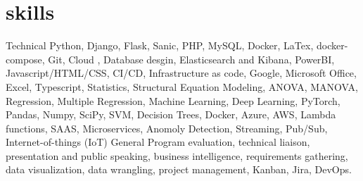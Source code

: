\documentclass[]{twentysecondcv}
\begin{document}
\section{skills}
	\begin{twentyshort}
	\twentyitemshort
	{Technical}
	{Python, Django, Flask, Sanic, PHP, MySQL, Docker, LaTex, docker-compose, Git, Cloud , Database desgin, Elasticsearch and Kibana, PowerBI, Javascript/HTML/CSS, CI/CD, Infrastructure as code, Google, Microsoft Office, Excel, Typescript, Statistics, Structural Equation Modeling, ANOVA, MANOVA, Regression, Multiple Regression, Machine Learning, Deep Learning, PyTorch, Pandas, Numpy, SciPy, SVM, Decision Trees, Docker, Azure, AWS, Lambda functions, SAAS, Microservices, Anomoly Detection, Streaming, Pub/Sub, Internet-of-things (IoT)}
	\twentyitemshort
	{General}
	{Program evaluation, technical liaison, presentation and public speaking, business intelligence, requirements gathering, data visualization, data wrangling, project management, Kanban, Jira, DevOps.}
	\end{twentyshort}

\end{document}
